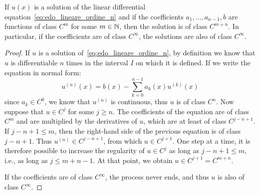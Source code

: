 \begin{theorem}%
  \label{th:maggiore_regolarita}%
If $u(x)$ is a solution of the linear differential
equation~\eqref{eq:edo_lineare_ordine_n} and if the coefficients $a_1, \dots,
a_{n-1}, b$ are functions of class $C^m$ for some $m\in {\mathbb N}$, then the solution
is of class $C^{m+n}$. In particular, if the coefficients are of class
$C^\infty$, the solutions are also of class $C^\infty$.
\end{theorem}
%
\begin{proof}
If $u$ is a solution of~\eqref{eq:edo_lineare_ordine_n},
by definition we know that $u$ is differentiable $n$ times in the interval $I$
on which it is defined.
If we write the equation in normal form:
\[
  u^{(n)}(x) = b(x) - \sum_{k=0}^{n-1}a_k(x) u^{(k)}(x)
\]
since $a_k \in C^0$, we know that $u^{(n)}$ is continuous, thus $u$ is of class
$C^n$.
Now suppose that $u\in C^j$ for some $j\ge n$.
The coefficients of the equation are of class $C^m$ and are multiplied by the
derivatives of $u$, which are at least of class $C^{j-n+1}$.
If $j-n+1 \le m$, then the right-hand side of the previous equation is of class
$j-n+1$.
Thus $u^{(n)}\in C^{j-n+1}$, from which $u\in C^{j+1}$.
One step at a time, it is therefore possible to increase the regularity of $u\in
C^j$ as long as $j-n+1\le m$, i.e., as long as $j\le m+n-1$. At that point, we
obtain $u\in C^{j+1} = C^{m+n}$.

If the coefficients are of class $C^\infty$, the process never ends,
and thus $u$ is also of class $C^\infty$.
\end{proof}